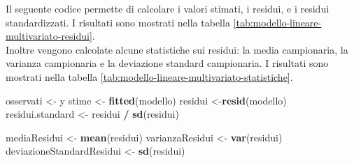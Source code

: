 \documentclass[]{book}
\newenvironment{Shaded}{\begin{snugshade}}{\end{snugshade}}
\newcommand{\KeywordTok}[1]{\textcolor[rgb]{0.13,0.29,0.53}{\textbf{#1}}}
\newcommand{\StringTok}[1]{\textcolor[rgb]{0.31,0.60,0.02}{#1}}
\newcommand{\OperatorTok}[1]{\textcolor[rgb]{0.81,0.36,0.00}{\textbf{#1}}}
\newcommand{\NormalTok}[1]{#1}
\begin{document}
Il seguente codice permette di calcolare i valori stimati, i residui, e
i residui standardizzati. I risultati sono mostrati nella tabella
\ref{tab:modello-lineare-multivariato-residui}.\\
Inoltre vengono calcolate alcune statistiche sui residui: la media
campionaria, la varianza campionaria e la deviazione standard
campionaria. I risultati sono mostrati nella tabella
\ref{tab:modello-lineare-multivariato-statistiche}.

\begin{Shaded}
\begin{Highlighting}[]
\NormalTok{osservati <-}\StringTok{ }\NormalTok{y}
\NormalTok{stime <-}\StringTok{ }\KeywordTok{fitted}\NormalTok{(modello)}
\NormalTok{residui <-}\KeywordTok{resid}\NormalTok{(modello)}
\NormalTok{residui.standard <-}\StringTok{ }\NormalTok{residui }\OperatorTok{/}\StringTok{ }\KeywordTok{sd}\NormalTok{(residui)}

\NormalTok{mediaResidui <-}\StringTok{ }\KeywordTok{mean}\NormalTok{(residui)}
\NormalTok{varianzaResidui <-}\StringTok{ }\KeywordTok{var}\NormalTok{(residui)}
\NormalTok{deviazioneStandardResidui <-}\StringTok{ }\KeywordTok{sd}\NormalTok{(residui)}
\end{Highlighting}
\end{Shaded}
\end{document}
